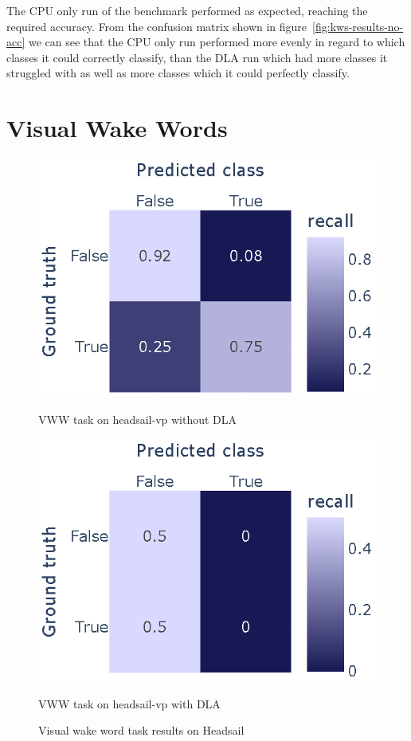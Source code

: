 \documentclass[12pt,a4paper,english
]{tunithesis}
\begin{document}
The CPU only run of the benchmark performed as expected, reaching the required accuracy. From the confusion matrix shown in figure~\ref{fig:kws-results-no-acc} we can see that the CPU only run performed more evenly in regard to which classes it could correctly classify, than the DLA run which had more classes it struggled with as well as more classes which it could perfectly classify.

\section{Visual Wake Words}
\begin{figure}
\centering
\begin{minipage}{.45\textwidth}
  \centering
  \includegraphics[width=\linewidth]{img/vww_200_no_acc.eps}
  \caption{VWW task on headsail-vp without DLA}
  \label{fig:vww-no-acc}
\end{minipage}
\begin{minipage}{.45\textwidth}
  \centering
  \includegraphics[width=\linewidth]{img/vww_200_acc.eps}
  \caption{VWW task on headsail-vp with DLA}
  \label{fig:vww-dla}
\end{minipage}%
\caption{Visual wake word task results on Headsail}
\label{fig:vww-results}
\end{figure}
\end{document}

